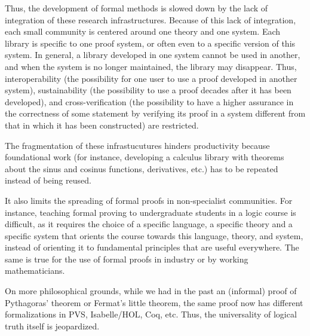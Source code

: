 Thus, the development of formal methods is slowed down by the lack of
integration of these research infrastructures.  Because of this lack
of integration, each small community is centered around one theory and
one system. Each library is specific to one proof system, or often
even to a specific version of this system. In general, a library
developed in one system cannot be used in another, and when the system
is no longer maintained, the library may disappear.  Thus,
interoperability (the possibility for one user to use a proof
developed in another system), sustainability (the possibility to use a
proof decades after it has been developed), and cross-verification
(the possibility to have a higher assurance in the correctness of some
statement by verifying its proof in a system different from that in
which it has been constructed) are restricted.

The fragmentation of these infrastucutures hinders productivity
because foundational work (for instance, developing a calculus library
with theorems about the sinus and cosinus functions, derivatives,
etc.) has to be repeated instead of being reused.

It also limits the spreading of formal proofs in non-specialist
communities. For instance, teaching formal proving to undergraduate
students in a logic course is difficult, as it requires the choice of
a specific language, a specific theory and a specific system that
orients the course towards this language, theory, and system, instead
of orienting it to fundamental principles that are useful
everywhere. The same is true for the use of formal proofs in industry
or by working mathematicians.

On more philosophical grounds, while we had in the past an (informal)
proof of Pythagoras' theorem or Fermat's little theorem, the same
proof now has different formalizations in PVS, Isabelle/HOL, Coq, etc.
Thus, the universality of logical truth itself is jeopardized.

